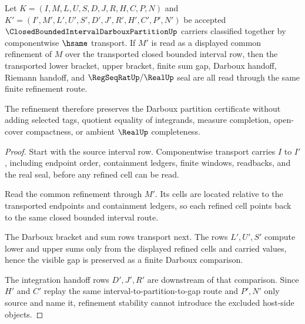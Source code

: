 \begin{theorem}
\label{thm:closed-bounded-interval-darboux-partition-refinement-stability}
Let $K=(I,M,L,U,S,D,J,R,H,C,P,N)$ and $K'=(I',M',L',U',S',D',J',R',H',C',P',N')$ be accepted $\ClosedBoundedIntervalDarbouxPartitionUp$ carriers classified together by componentwise $\hsame$ transport. If $M'$ is read as a displayed common refinement of $M$ over the transported closed bounded interval row, then the transported lower bracket, upper bracket, finite sum gap, Darboux handoff, Riemann handoff, and $\RegSeqRatUp/\RealUp$ seal are all read through the same finite refinement route.

The refinement therefore preserves the Darboux partition certificate without adding selected tags, quotient equality of integrands, measure completion, open-cover compactness, or ambient $\RealUp$ completeness.
\end{theorem}
\begin{proof}
Start with the source interval row. Componentwise transport carries $I$ to $I'$, including endpoint order, containment ledgers, finite windows, readbacks, and the real seal, before any refined cell can be read.

Read the common refinement through $M'$. Its cells are located relative to the transported endpoints and containment ledgers, so each refined cell points back to the same closed bounded interval route.

The Darboux bracket and sum rows transport next. The rows $L',U',S'$ compute lower and upper sums only from the displayed refined cells and carried values, hence the visible gap is preserved as a finite Darboux comparison.

The integration handoff rows $D',J',R'$ are downstream of that comparison. Since $H'$ and $C'$ replay the same interval-to-partition-to-gap route and $P',N'$ only source and name it, refinement stability cannot introduce the excluded host-side objects.
\end{proof}

